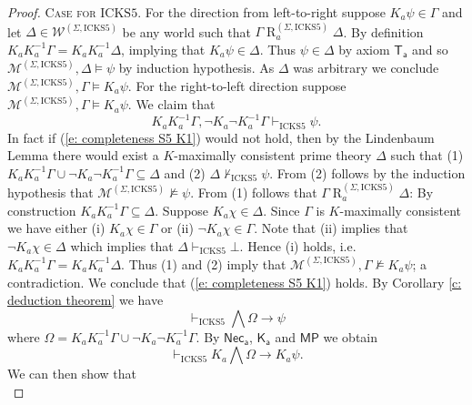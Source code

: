 \documentclass[10pt,a4paper]{amsart}
\newcommand{\K}{K}
\newcommand{\Rel}{\mathrel{R}}
\newcommand{\W}{\mathcal{W}}
\newcommand{\agi}{a}
\newcommand{\fw}{\mathcal{M}}
\newcommand{\hickss}{\mathrm{ICKS5}}
\begin{document}
\begin{proof}
 \noindent \textsc{Case for $\hickss$.} For the direction from left-to-right suppose $\K_\agi \psi \in \Gamma$ and let $\Delta \in \W^{(\Sigma, \hickss)}$ be any world such that $\Gamma \Rel_\agi^{(\Sigma, \hickss)} \Delta$. By definition $\K_\agi \K_\agi^{-1} \Gamma = \K_\agi \K_\agi^{-1} \Delta$, implying that $\K_\agi \psi \in \Delta$. Thus $\psi \in \Delta$ by axiom $\mathsf{T_\agi}$ and so $\fw^{(\Sigma, \hickss)}, \Delta \models \psi$ by induction hypothesis. As $\Delta$ was arbitrary we conclude $\fw^{(\Sigma, \hickss)}, \Gamma \models \K_\agi \psi$. For the right-to-left direction suppose $\fw^{(\Sigma, \hickss)}, \Gamma \models \K_\agi \psi$. We claim that
 \begin{equation}\label{e: completeness S5 K1}
     \K_\agi \K_\agi^{-1} \Gamma, \neg \K_\agi \neg \K_\agi^{-1} \Gamma \vdash_\hickss \psi.
 \end{equation}
 In fact if (\ref{e: completeness S5 K1}) would not hold, then by the Lindenbaum Lemma there would exist a $\K$-maximally consistent prime theory $\Delta$ such that (1) $ \K_\agi \K_\agi^{-1} \Gamma \cup \neg \K_\agi \neg \K_\agi^{-1} \Gamma \subseteq \Delta$ and (2) $\Delta \not \vdash_\hickss \psi$. From (2) follows by the induction hypothesis that $\fw^{(\Sigma, \hickss)} \not \models \psi$. From (1) follows that $\Gamma \Rel_\agi^{(\Sigma, \hickss)} \Delta$: By construction $\K_\agi \K_\agi^{-1} \Gamma \subseteq \Delta$. Suppose $\K_\agi \chi \in \Delta$. Since $\Gamma$ is $\K$-maximally consistent we have either (i) $\K_\agi \chi \in \Gamma$ or (ii) $\neg \K_\agi \chi \in \Gamma$. Note that (ii) implies that $\neg \K_\agi \chi \in \Delta$ which implies that $\Delta \vdash_\hickss \bot$. Hence (i) holds, i.e. $\K_\agi \K_\agi^{-1} \Gamma = \K_\agi \K_\agi^{-1} \Delta$. Thus (1) and (2) imply that $\fw^{(\Sigma, \hickss)}, \Gamma \not \models \K_\agi \psi$; a contradiction. We conclude that (\ref{e: completeness S5 K1}) holds. By Corollary \ref{c: deduction theorem} we have
 \begin{equation}\label{e: completeness S5 K2}
     \vdash_\hickss \bigwedge \Omega \rightarrow \psi
 \end{equation}
 where $\Omega = \K_\agi \K_\agi^{-1} \Gamma \cup \neg \K_\agi \neg \K_\agi^{-1} \Gamma$. By $\mathsf{Nec_\agi}$, $\mathsf{K_\agi}$ and $\mathsf{MP}$ we obtain
 \begin{equation}\label{e: completeness S5 K3}
     \vdash_\hickss \K_\agi \bigwedge \Omega \rightarrow \K_\agi \psi.
 \end{equation}
We can then show that 
 \begin{equation}\label{e: completeness S5 K4}

\end{equation}
\end{proof}
\end{document}
